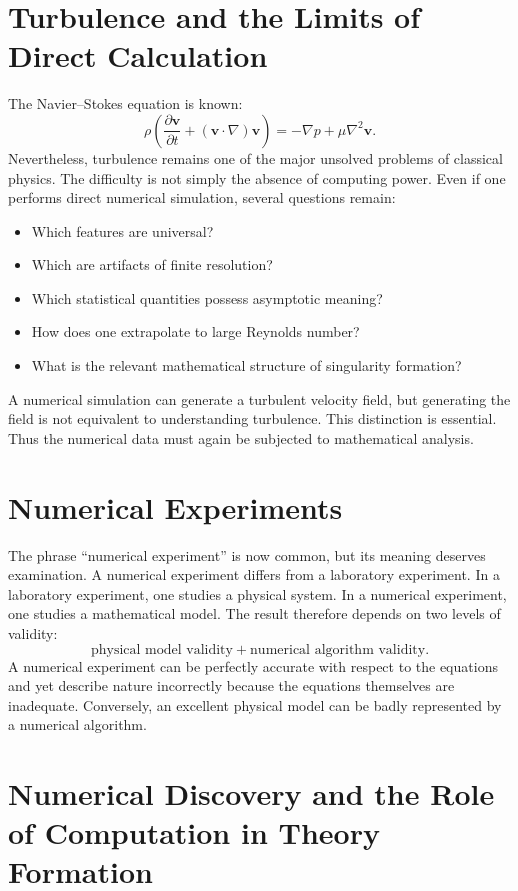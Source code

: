 \section{ Turbulence and the Limits of Direct Calculation}
\label{nm:trb}

The Navier--Stokes equation is known:
\[\rho\left(\frac{\partial\mathbf{v}}{\partial t}+
(\mathbf{v}\cdot\nabla)\mathbf{v}\right)=-\nabla p+
\mu\nabla^2\mathbf{v}.
\]
Nevertheless, turbulence remains one of the major unsolved problems of classical physics.
The difficulty is not simply the absence of computing power.
Even if one performs direct numerical simulation, several questions remain:
\begin{itemize}
\item Which features are universal?
\item Which are artifacts of finite resolution?
\item Which statistical quantities possess asymptotic meaning?
\item How does one extrapolate to large Reynolds number?
\item What is the relevant mathematical structure of singularity formation?
\end{itemize}
A numerical simulation can generate a turbulent velocity field, but generating
the field is not equivalent to understanding turbulence.
This distinction is essential.
Thus the numerical data must again be subjected to mathematical analysis.

\section{ Numerical Experiments}
\label{nm:ne}

The phrase ``numerical experiment'' is now common, but its meaning deserves examination.
A numerical experiment differs from a laboratory experiment.
In a laboratory experiment, one studies a physical system.
In a numerical experiment, one studies a mathematical model.
The result therefore depends on two levels of validity:
\[\boxed{\text{physical model validity}+\text{numerical algorithm validity}.}\]
A numerical experiment can be perfectly accurate with respect to the equations
and yet describe nature incorrectly because the equations themselves are
inadequate.
Conversely, an excellent physical model can be badly represented by a numerical
algorithm.

\section{ Numerical Discovery and the Role of Computation in Theory Formation}
\label{nm:rc}

